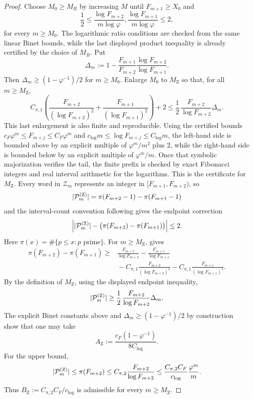 \begin{proof}
  Choose \(M_0\ge M_R\) by increasing \(M\) until \(F_{m+1}\ge X_0\)
  and
  \[
    \frac12\le
    \frac{\log F_{m+2}}{m\log\varphi},
    \frac{\log F_{m+1}}{m\log\varphi}
    \le2,
  \]
  for every \(m\ge M_0\). The logarithmic ratio conditions are checked
  from the same linear Binet bounds, while the last displayed
  product inequality is already certified by the choice of \(M_R\). Put
  \[
    \Delta_m:=
    1-\frac{F_{m+1}}{F_{m+2}}
      \frac{\log F_{m+2}}{\log F_{m+1}}.
  \]
  Then \(\Delta_m\ge(1-\varphi^{-1})/2\) for \(m\ge M_0\). Enlarge
  \(M_0\) to \(M_{\mathrm Z}\) so that, for all \(m\ge M_{\mathrm Z}\),
  \[
    C_{\pi,1}\left(
      \frac{F_{m+2}}{(\log F_{m+2})^2}
      +\frac{F_{m+1}}{(\log F_{m+1})^2}\right)+2
    \le
    \frac12\,\frac{F_{m+2}}{\log F_{m+2}}\Delta_m .
  \]
  This last enlargement is also finite and reproducible. Using the
  certified bounds \(c_F\varphi^m\le F_{m+j}\le C_F\varphi^m\) and
  \(c_{\log}m\le\log F_{m+j}\le C_{\log}m\), the left-hand side is
  bounded above by an explicit multiple of \(\varphi^m/m^2\) plus \(2\),
  while the right-hand side is bounded below by an explicit multiple of
  \(\varphi^m/m\). Once that symbolic majorization verifies the tail,
  the finite prefix is checked by exact Fibonacci integers and real
  interval arithmetic for the logarithms. This is the certificate for
  \(M_{\mathrm Z}\).
  Every word in \(\mathcal Z_m\) represents an integer in
  \([F_{m+1},F_{m+2})\), so
  \[
    \lvert \mathcal P_m^{(\mathrm Z)} \rvert
    =\pi(F_{m+2}-1)-\pi(F_{m+1}-1)
  \]
  and the interval-count convention following
   gives the endpoint correction
  \[
    \left|
      \lvert \mathcal P_m^{(\mathrm Z)} \rvert-
      \bigl(\pi(F_{m+2})-\pi(F_{m+1})\bigr)
    \right|\le 2.
  \]
  Here \(\pi(x)=\#\{p\le x:p\text{ prime}\}\). For
  \(m\ge M_{\mathrm Z}\),  gives
  \[
    \begin{aligned}
    \pi(F_{m+2})-\pi(F_{m+1})
    \ge
    &\frac{F_{m+2}}{\log F_{m+2}}
      -\frac{F_{m+1}}{\log F_{m+1}}\\
    &{}-C_{\pi,1}\frac{F_{m+2}}{(\log F_{m+2})^2}
      -C_{\pi,1}\frac{F_{m+1}}{(\log F_{m+1})^2}.
    \end{aligned}
  \]
  By the definition of \(M_{\mathrm Z}\), using the displayed endpoint
  inequality,
  \[
    \lvert \mathcal P_m^{(\mathrm Z)} \rvert
    \ge \frac12\,\frac{F_{m+2}}{\log F_{m+2}}\Delta_m .
  \]
  The explicit Binet constants above and
  \(\Delta_m\ge(1-\varphi^{-1})/2\) by construction show that one may
  take
  \[
    A_{\mathrm Z}:=\frac{c_F(1-\varphi^{-1})}{8C_{\log}}.
  \]
  For the upper bound,
  \[
    \lvert \mathcal P_m^{(\mathrm Z)} \rvert\le \pi(F_{m+2})
      \le C_{\pi,2}\frac{F_{m+2}}{\log F_{m+2}}
      \le \frac{C_{\pi,2}C_F}{c_{\log}}\frac{\varphi^m}{m}.
  \]
  Thus \(B_{\mathrm Z}:=C_{\pi,2}C_F/c_{\log}\) is admissible for every
  \(m\ge M_{\mathrm Z}\).
\end{proof}

